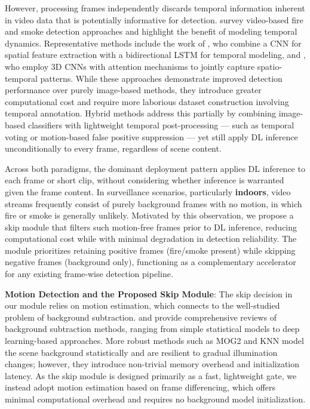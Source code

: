 \documentclass[
  10pt,
]{article}
\begin{document}
However, processing frames independently discards temporal information
inherent in video data that is potentially informative for detection.
 survey video-based fire and smoke
detection approaches and highlight the benefit of modeling temporal
dynamics. Representative methods include the work of
, who combine a CNN for spatial
feature extraction with a bidirectional LSTM for temporal modeling, and
, who employ 3D CNNs with attention
mechanisms to jointly capture spatio-temporal patterns. While these
approaches demonstrate improved detection performance over purely
image-based methods, they introduce greater computational cost and
require more laborious dataset construction involving temporal
annotation. Hybrid methods address this partially by combining
image-based classifiers with lightweight temporal post-processing ---
such as temporal voting  or
motion-based false positive suppression
 --- yet still apply DL
inference unconditionally to every frame, regardless of scene content.

Across both paradigms, the dominant deployment pattern applies DL
inference to each frame or short clip, without considering whether
inference is warranted given the frame content. In surveillance
scenarios, particularly \textbf{indoors}, video streams frequently
consist of purely background frames with no motion, in which fire or
smoke is generally unlikely. Motivated by this observation, we propose a
skip module that filters such motion-free frames prior to DL inference,
reducing computational cost while with minimal degradation in detection
reliability. The module prioritizes retaining positive frames
(fire/smoke present) while skipping negative frames (background only),
functioning as a complementary accelerator for any existing frame-wise
detection pipeline.

\textbf{Motion Detection and the Proposed Skip Module}: The skip
decision in our module relies on motion estimation, which connects to
the well-studied problem of background subtraction.
 and
 provide comprehensive
reviews of background subtraction methods, ranging from simple
statistical models to deep learning-based approaches. More robust
methods such as MOG2 and KNN
 model the scene
background statistically and are resilient to gradual illumination
changes; however, they introduce non-trivial memory overhead and
initialization latency. As the skip module is designed primarily as a
fast, lightweight gate, we instead adopt motion estimation based on
frame differencing, which offers minimal computational overhead and
requires no background model initialization.
\end{document}
